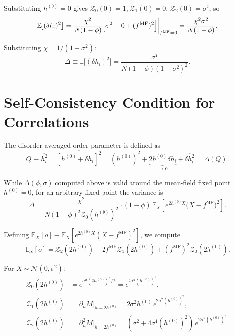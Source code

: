 \documentclass[aps,prb,onecolumn,showpacs,preprintnumbers,amsmath,amssymb]{revtex4-2}
\newcommand{\fMF}{f^{\mathrm{MF}}}
\begin{document}
Substituting $h^{(0)}=0$ gives $\mathcal{Z}_0(0)=1$, $\mathcal{Z}_1(0)=0$, $\mathcal{Z}_2(0)=\sigma^2$, so
\begin{equation}
    \mathbb{E}\!\bigl[(\delta h_i)^2\bigr]
    = \frac{\chi^2}{N(1-\phi)}\Bigl[\sigma^2 - 0 + (\fMF)^2\Bigr]\bigg|_{\fMF=0}
    = \frac{\chi^2\sigma^2}{N(1-\phi)}.
\end{equation}

Substituting $\chi = 1/(1-\sigma^2)$:
\begin{equation}
    \Delta \equiv \mathbb{E}\!\bigl[(\delta h_i)^2\bigr]
           = \frac{\sigma^2}{N(1-\phi)(1-\sigma^2)^2}.
\end{equation}

\section{Self-Consistency Condition for Correlations}

The disorder-averaged order parameter is defined as
\begin{equation}
    Q \equiv \overline{h_i^2}
    = \overline{[h^{(0)} + \delta h_i]^2}
    = (h^{(0)})^2 + \underbrace{2h^{(0)}\overline{\delta h_i}}_{\to 0} + \overline{\delta h_i^2}
    = \Delta(Q).
\end{equation}

While $\Delta(\phi, \sigma)$ computed above is valid around the mean-field fixed
point $h^{(0)}=0$, for an arbitrary fixed point the variance is
\begin{equation}
    \Delta = \frac{\chi^2}{N(1-\phi)^2\mathcal{Z}_0(h^{(0)})^2}
             \cdot (1-\phi)\,\mathbb{E}_X\!\left[e^{2h^{(0)}X}\bigl(X-\fMF\bigr)^2\right].
\end{equation}

Defining $\mathbb{E}_X[o] \equiv \mathbb{E}_X\!\left[e^{2h^{(0)}X}(X-\fMF)^2\right]$, we compute
\begin{equation}
    \mathbb{E}_X[o]
    = \mathcal{Z}_2(2h^{(0)}) - 2\fMF\mathcal{Z}_1(2h^{(0)}) + (\fMF)^2\mathcal{Z}_0(2h^{(0)}).
\end{equation}

For $X\sim\mathcal{N}(0,\sigma^2)$:
\begin{align}
    \mathcal{Z}_0(2h^{(0)}) &= e^{\sigma^2(2h^{(0)})^2/2} = e^{2\sigma^2(h^{(0)})^2}, \\
    \mathcal{Z}_1(2h^{(0)}) &= \partial_h M\big|_{h=2h^{(0)}} = 2\sigma^2 h^{(0)}\,e^{2\sigma^2(h^{(0)})^2}, \\
    \mathcal{Z}_2(2h^{(0)}) &= \partial_h^2 M\big|_{h=2h^{(0)}} = (\sigma^2 + 4\sigma^4(h^{(0)})^2)\,e^{2\sigma^2(h^{(0)})^2}.
\end{align}
\end{document}

